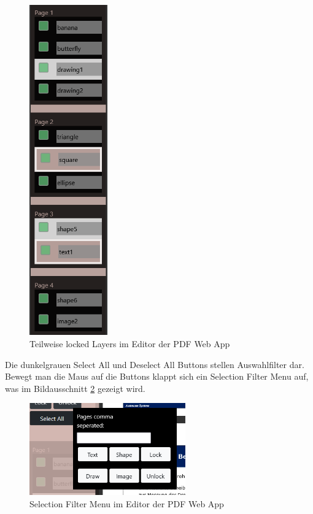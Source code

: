 \begin{figure}[!htbp]
	\centering
	\includegraphics[width=0.3\textwidth]{"images/ebenen.png"}
	\caption{Teilweise locked Layers im Editor der PDF Web App}
	\label{fig:ebenen}
\end{figure}

Die dunkelgrauen Select All und Deselect All Buttons stellen Auswahlfilter dar. Bewegt man die Maus auf die Buttons klappt sich ein Selection Filter Menu auf, was im Bildausschnitt \ref{fig:filtermenu} gezeigt wird. 

\begin{figure}[!htbp]
	\centering
	\includegraphics[width=0.6\textwidth]{"images/filtermenu.png"}
	\caption{Selection Filter Menu im Editor der PDF Web App}
	\label{fig:filtermenu}
\end{figure}


